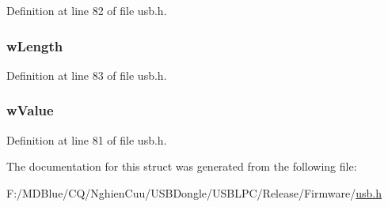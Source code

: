 Definition at line 82 of file usb.h.

\hypertarget{struct___u_s_b___s_e_t_u_p___p_a_c_k_e_t_ab26bdd09e9c7779cfbd95b4e90b3f178}{
\subsubsection[{wLength}]{ {\bf wLength}}}
\label{struct___u_s_b___s_e_t_u_p___p_a_c_k_e_t_ab26bdd09e9c7779cfbd95b4e90b3f178}


Definition at line 83 of file usb.h.

\hypertarget{struct___u_s_b___s_e_t_u_p___p_a_c_k_e_t_a59d9039047a52815cb1981f19634d40d}{
\subsubsection[{wValue}]{ {\bf wValue}}}
\label{struct___u_s_b___s_e_t_u_p___p_a_c_k_e_t_a59d9039047a52815cb1981f19634d40d}


Definition at line 81 of file usb.h.



The documentation for this struct was generated from the following file:\begin{DoxyCompactItemize}
\item 
F:/MDBlue/CQ/NghienCuu/USBDongle/USBLPC/Release/Firmware/\hyperlink{usb_8h}{usb.h}\end{DoxyCompactItemize}
